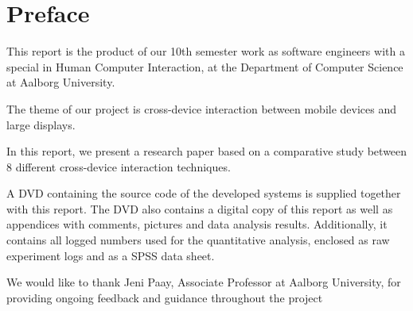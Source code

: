 \section*{Preface}\label{sec:preface}

This report is the product of our 10th semester work as software engineers with a special in Human Computer Interaction, at the Department of Computer Science at Aalborg University.

The theme of our project is cross-device interaction between mobile devices and large displays.

In this report, we present a research paper based on a comparative study between 8 different cross-device interaction techniques.

A DVD containing the source code of the developed systems is supplied together with this report.
The DVD also contains a digital copy of this report as well as appendices with comments, pictures and data analysis results.
Additionally, it contains all logged numbers used for the quantitative analysis, enclosed as raw experiment logs and as a SPSS data sheet.

We would like to thank Jeni Paay, Associate Professor at Aalborg University, for providing ongoing feedback and guidance throughout the project